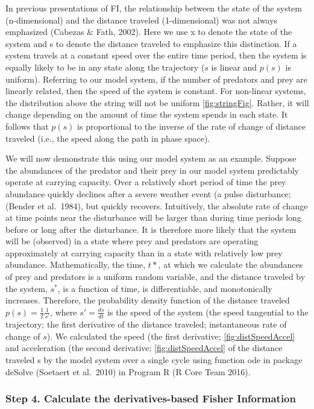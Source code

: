 \documentclass[12pt,twoside,openany]{reedthesis}
\begin{document}
In previous presentations of FI, the relationship between the state of the system (n-dimensional) and the distance traveled (1-dimensional) was not always emphasized (Cabezas \& Fath, 2002). Here we use x to denote the state of the system and s to denote the distance traveled to emphasize this distinction. If a system travels at a constant speed over the entire time period, then the system is equally likely to be in any state along the trajectory (\(s\) is linear and \(p(s)\) is uniform). Referring to our model system, if the number of predators and prey are linearly related, then the speed of the system is constant. For non-linear systems, the distribution above the string will not be uniform \ref{fig:stringFig}. Rather, it will change depending on the amount of time the system spends in each state. It follows that \(p(s)\) is proportional to the inverse of the rate of change of distance traveled (i.e., the speed along the path in phase space).

We will now demonstrate this using our model system as an example. Suppose the abundances of the predator and their prey in our model system predictably operate at carrying capacity. Over a relatively short period of time the prey abundance quickly declines after a severe weather event (a pulse disturbance; (Bender et al.~1984), but quickly recovers. Intuitively, the absolute rate of change at time points near the disturbance will be larger than during time periods long before or long after the disturbance. It is therefore more likely that the system will be (observed) in a state where prey and predators are operating approximately at carrying capacity than in a state with relatively low prey abundance. Mathematically, the time, \(t*\), at which we calculate the abundances of prey and predators is a uniform random variable, and the distance traveled by the system, \(s^*\), is a function of time, is differentiable, and monotonically increases. Therefore, the probability density function of the distance traveled \(p(s)=\frac{1}{T}\frac{1}{s'}\), where \(s'= \frac{ds}{dt}\) is the speed of the system (the speed tangential to the trajectory; the first derivative of the distance traveled; instantaneous rate of change of \(s\)). We calculated the speed (the first derivative; \ref{fig:distSpeedAccel} and acceleration (the second derivative; \ref{fig:distSpeedAccel} of the distance traveled s by the model system over a single cycle using function ode in package deSolve (Soetaert et al.~2010) in Program R (R Core Team 2016).

\hypertarget{step-4.-calculate-the-derivatives-based-fisher-information}{%
\subsubsection{\texorpdfstring{\textbf{Step 4.} Calculate the derivatives-based Fisher Information}{Step 4. Calculate the derivatives-based Fisher Information}}\label{step-4.-calculate-the-derivatives-based-fisher-information}}
\end{document}
